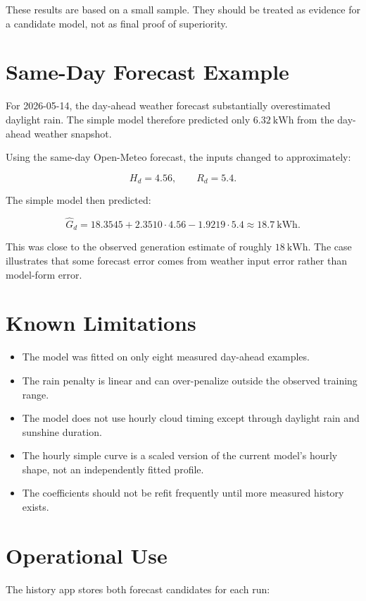 \documentclass[11pt,a4paper]{article}
\begin{document}
These results are based on a small sample. They should be treated as evidence for a candidate model, not as final proof of superiority.

\section{Same-Day Forecast Example}

For 2026-05-14, the day-ahead weather forecast substantially overestimated daylight rain. The simple model therefore predicted only \(6.32\ \mathrm{kWh}\) from the day-ahead weather snapshot.

Using the same-day Open-Meteo forecast, the inputs changed to approximately:

\[
H_d = 4.56,
\qquad
R_d = 5.4.
\]

The simple model then predicted:

\[
\widehat{G}_d =
18.3545 + 2.3510 \cdot 4.56 - 1.9219 \cdot 5.4
\approx 18.7\ \mathrm{kWh}.
\]

This was close to the observed generation estimate of roughly \(18\ \mathrm{kWh}\). The case illustrates that some forecast error comes from weather input error rather than model-form error.

\section{Known Limitations}

\begin{itemize}
  \item The model was fitted on only eight measured day-ahead examples.
  \item The rain penalty is linear and can over-penalize outside the observed training range.
  \item The model does not use hourly cloud timing except through daylight rain and sunshine duration.
  \item The hourly simple curve is a scaled version of the current model's hourly shape, not an independently fitted profile.
  \item The coefficients should not be refit frequently until more measured history exists.
\end{itemize}

\section{Operational Use}

The history app stores both forecast candidates for each run:
\end{document}
